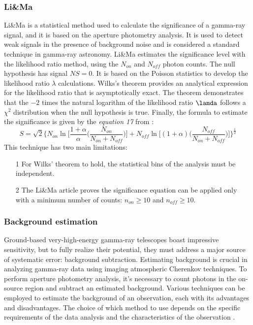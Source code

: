 \subsubsection{Li\&Ma}
\label{ss:li-ma}
Li\&Ma is a statistical method used to calculate the significance of a gamma-ray signal, and it is based on the aperture photometry analysis. It is used to detect weak signals in the presence of background noise and is considered a standard technique in gamma-ray astronomy. Li\&Ma estimates the significance level with the likelihood ratio method, using the $N_{on}$ and $N_{off}$ photon counts. The null hypothesis has signal $NS = 0$. It is based on the Poisson statistics to develop the likelihood ratio $\lambda$ calculations. Wilks's theorem \cite{wilks_1938} provides an analytical expression for the likelihood ratio that is asymptotically exact. The theorem demonstrates that the $-2$ times the natural logarithm of the likelihood ratio $\lamda$ follows a $\chi^2$ distribution when the null hypothesis is true. Finally, the formula to estimate the significance is given by the \textit{equation 17} from \cite{Lima_1983}: 
\begin{equation}
    S = \sqrt{2}\biggl\{N_{on}\ln\biggr[ \frac{1+\alpha}{\alpha} \biggl( \frac{N_{on}}{N_{on}+N_{off}}\biggl) \biggr] + N_{off}\ln\biggr[(1+\alpha)\biggl(\frac{N_{off}}{N_{on}+N_{off}}\biggl) \biggr] \biggl\}^\frac{1}{2}
\end{equation}
This technique has two main limitations:
\begin{enumerate}
    \item[1] For Wilks' theorem to hold, the statistical bins of the analysis must be independent.
    \item[2] The Li\&Ma article \cite{Lima_1983} proves the significance equation can be applied only with a minimum number of counts: $n_{on} \geq 10$ and $ n_{off} \geq 10$. 
\end{enumerate}


\subsubsection{Background estimation}
\label{sss:background-estimation}
Ground-based very-high-energy gamma-ray telescopes boast impressive sensitivity, but to fully realize their potential, they must address a major source of systematic error: background subtraction. Estimating background is crucial in analyzing gamma-ray data using imaging atmospheric Cherenkov techniques. To perform aperture photometry analysis, it's necessary to count photons in the on-source region and subtract an estimated background. Various techniques can be employed to estimate the background of an observation, each with its advantages and disadvantages. The choice of which method to use depends on the specific requirements of the data analysis and the characteristics of the observation \cite{Berge_2007}. 

